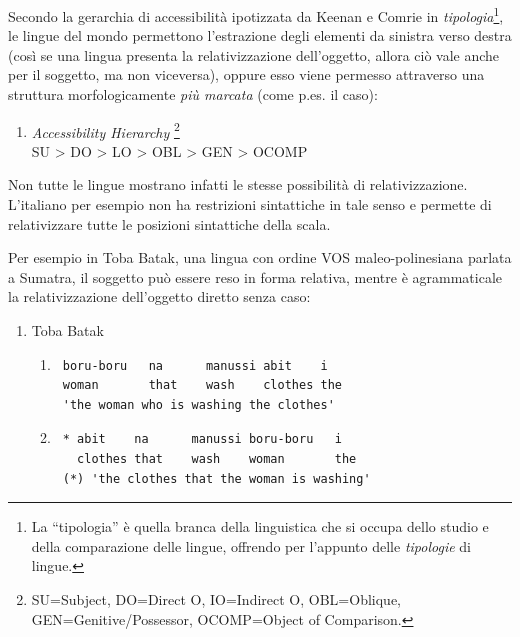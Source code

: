 \documentclass[
  a4paper,
  twoside,
  11pt,
  chapterprefix=false,
  bibliography=totocnumbered,
  listof=flat]{scrbook}
\providecommand{\tightlist}{%
  \setlength{\itemsep}{0pt}\setlength{\parskip}{0pt}}
\begin{document}
Secondo la gerarchia di accessibilità ipotizzata da Keenan e Comrie in \emph{tipologia}\footnote{La \enquote{tipologia} è quella branca della linguistica che si occupa dello studio e della comparazione delle lingue, offrendo per l'appunto delle \emph{tipologie} di lingue.}, le lingue del mondo permettono l'estrazione degli elementi da sinistra verso destra (così se una lingua presenta la relativizzazione dell'oggetto, allora ciò vale anche per il soggetto, ma non viceversa), oppure esso viene permesso attraverso una struttura morfologicamente \emph{più marcata} (come p.es. il caso):

\begin{enumerate}
\def\labelenumi{(\arabic{enumi})}
\setcounter{enumi}{124}
\tightlist
\item
  \emph{Accessibility Hierarchy} \citep{keenanComrie1977}\footnote{SU=Subject, DO=Direct O, IO=Indirect O, OBL=Oblique, GEN=Genitive/Possessor, OCOMP=Object of Comparison.}\\
  SU \textgreater{} DO \textgreater{} LO \textgreater{} OBL \textgreater{} GEN \textgreater{} OCOMP
\end{enumerate}

Non tutte le lingue mostrano infatti le stesse possibilità di relativizzazione. L'italiano per esempio non ha restrizioni sintattiche in tale senso e permette di relativizzare tutte le posizioni sintattiche della scala.

Per esempio in Toba Batak, una lingua con ordine VOS maleo-polinesiana parlata a Sumatra, il soggetto può essere reso in forma relativa, mentre è agrammaticale la relativizzazione dell'oggetto diretto senza caso:

\begin{enumerate}
\def\labelenumi{(\arabic{enumi})}
\setcounter{enumi}{125}
\tightlist
\item
  Toba Batak \citep[da][68]{keenanComrie1977}

  \begin{enumerate}
  \def\labelenumii{\alph{enumii}.}
  \item
\begin{verbatim}
 boru-boru   na      manussi abit    i   
 woman       that    wash    clothes the   
 'the woman who is washing the clothes'  
\end{verbatim}
  \item
\begin{verbatim}
 * abit    na      manussi boru-boru   i   
   clothes that    wash    woman       the   
 (*) 'the clothes that the woman is washing'     
\end{verbatim}
  \end{enumerate}
\end{enumerate}
\end{document}
